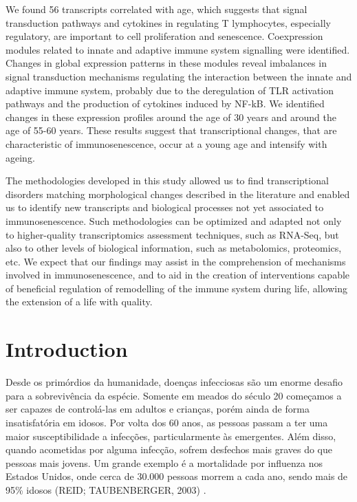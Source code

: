 \documentclass[]{book}
\begin{document}
We found 56 transcripts correlated with age, which suggests that signal transduction pathways and cytokines in regulating T lymphocytes, especially regulatory, are important to cell proliferation and senescence. Coexpression modules related to innate and adaptive immune system signalling were identified. Changes in global expression patterns in these modules reveal imbalances in signal transduction mechanisms regulating the interaction between the innate and adaptive immune system, probably due to the deregulation of TLR activation pathways and the production of cytokines induced by NF-kB. We identified changes in these expression profiles around the age of 30 years and around the age of 55-60 years. These results suggest that transcriptional changes, that are characteristic of immunosenescence, occur at a young age and intensify with ageing.

The methodologies developed in this study allowed us to find transcriptional disorders matching morphological changes described in the literature and enabled us to identify new transcripts and biological processes not yet associated to immunosenescence. Such methodologies can be optimized and adapted not only to higher-quality transcriptomics assessment techniques, such as RNA-Seq, but also to other levels of biological information, such as metabolomics, proteomics, etc. We expect that our findings may assist in the comprehension of mechanisms involved in immunosenescence, and to aid in the creation of interventions capable of beneficial regulation of remodelling of the immune system during life, allowing the extension of a life with quality.

\hypertarget{intro}{%
\chapter{Introduction}\label{intro}}

Desde os primórdios da humanidade, doenças infecciosas são um enorme
desafio para a sobrevivência da espécie. Somente em meados do século 20
começamos a ser capazes de controlá-las em adultos e crianças, porém ainda de
forma insatisfatória em idosos. Por volta dos 60 anos, as pessoas passam a ter uma
maior susceptibilidade a infecções, particularmente às emergentes. Além disso, quando
acometidas por alguma infecção, sofrem desfechos mais graves do que pessoas mais
jovens. Um grande exemplo é a mortalidade por influenza nos Estados Unidos, onde
cerca de 30.000 pessoas morrem a cada ano, sendo mais de 95\% idosos (REID;
TAUBENBERGER, 2003) \citep{Reid}.
\end{document}
